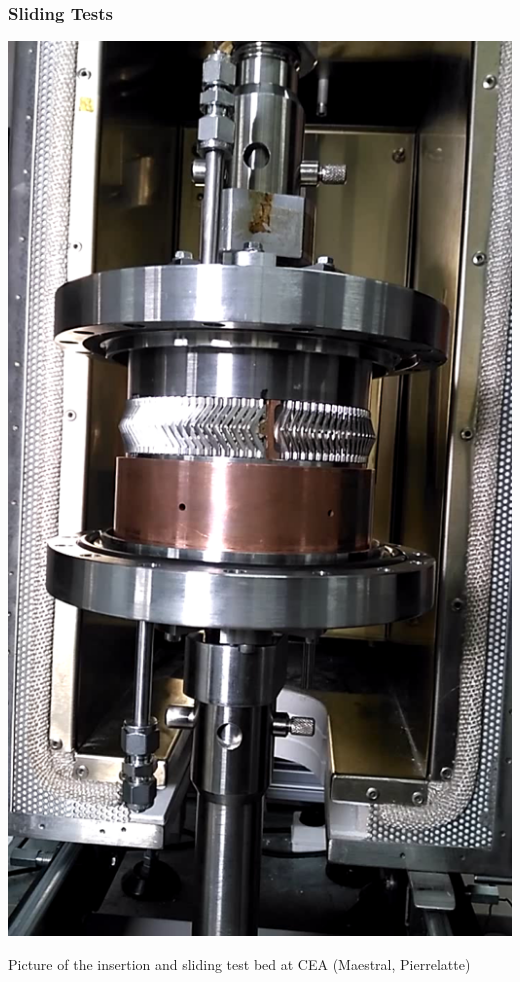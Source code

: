 {\subsubsection{Sliding Tests}
\begin{marginfigure}
	\centering
	\includegraphics[width=1.0\linewidth]{figures/chap3/RF_contacts/RF_contact_LACUT_sliding_tests}
	\caption{Picture of the insertion and sliding test bed at CEA (Maestral, Pierrelatte)}
	\label{fig:rfcontactlacutslidingtests}
\end{marginfigure}

}
